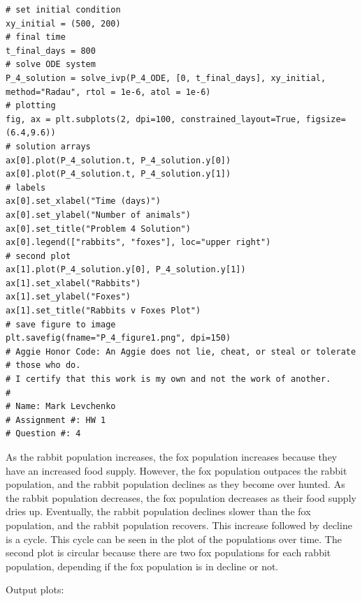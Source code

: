 \documentclass[12pt]{article}
\begin{document}
\begin{enumerate}
\begin{verbatim}
# set initial condition
xy_initial = (500, 200)
# final time
t_final_days = 800
# solve ODE system
P_4_solution = solve_ivp(P_4_ODE, [0, t_final_days], xy_initial, method="Radau", rtol = 1e-6, atol = 1e-6)
# plotting
fig, ax = plt.subplots(2, dpi=100, constrained_layout=True, figsize=(6.4,9.6))
# solution arrays
ax[0].plot(P_4_solution.t, P_4_solution.y[0])
ax[0].plot(P_4_solution.t, P_4_solution.y[1])
# labels
ax[0].set_xlabel("Time (days)")
ax[0].set_ylabel("Number of animals")
ax[0].set_title("Problem 4 Solution")
ax[0].legend(["rabbits", "foxes"], loc="upper right")
# second plot
ax[1].plot(P_4_solution.y[0], P_4_solution.y[1])
ax[1].set_xlabel("Rabbits")
ax[1].set_ylabel("Foxes")
ax[1].set_title("Rabbits v Foxes Plot")
# save figure to image
plt.savefig(fname="P_4_figure1.png", dpi=150)
# Aggie Honor Code: An Aggie does not lie, cheat, or steal or tolerate
# those who do.
# I certify that this work is my own and not the work of another.
#
# Name: Mark Levchenko
# Assignment #: HW 1
# Question #: 4
\end{verbatim}
    As the rabbit population increases, the fox population increases because they have an increased food supply. However, the fox population outpaces the rabbit population, and the rabbit population declines as they become over hunted. As the rabbit population decreases, the fox population decreases as their food supply dries up. Eventually, the rabbit population declines slower than the fox population, and the rabbit population recovers. This increase followed by decline is a cycle. This cycle can be seen in the plot of the populations over time. The second plot is circular because there are two fox populations for each rabbit population, depending if the fox population is in decline or not.

    Output plots:
    

\end{enumerate}
\end{document}
